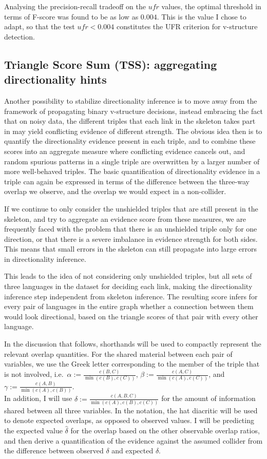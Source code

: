 Analysing the precision-recall tradeoff on the $ufr$ values, the optimal threshold in terms of F-score was found to be as low as $0.004$. This is the value I chose to adapt, so that the test $ufr < 0.004$ constitutes the UFR criterion for v-structure detection. 

\subsection{Triangle Score Sum (TSS): aggregating directionality hints}
Another possibility to stabilize directionality inference is to move away from the framework of propagating binary v-structure decisions, instead embracing the fact that on noisy data, the different triples that each link in the skeleton takes part in may yield conflicting evidence of different strength. The obvious idea then is to quantify the directionality evidence present in each triple, and to combine these scores into an aggregate measure where conflicting evidence cancels out, and random spurious patterns in a single triple are overwritten by a larger number of more well-behaved triples. The basic quantification of directionality evidence in a triple can again be expressed in terms of the difference between the three-way overlap we observe, and the overlap we would expect in a non-collider.

If we continue to only consider the unshielded triples that are still present in the skeleton, and try to aggregate an evidence score from these measures, we are frequently faced with the problem that there is an unshielded triple only for one direction, or that there is a severe imbalance in evidence strength for both sides. This means that small errors in the skeleton can still propagate into large errors in directionality inference.

This leads to the idea of not considering only unshielded triples, but all sets of three languages in the dataset for deciding each link, making the directionality inference step independent from skeleton inference. The resulting score infers for every pair of languages in the entire graph whether a connection between them would look directional, based on the triangle scores of that pair with every other language.

In the discussion that follows, shorthands will be used to compactly represent the relevant overlap quantities. For the shared material between each pair of variables, we use the Greek letter corresponding to the member of the triple that is not involved, i.e.\ $\alpha := \frac{c(B,C)}{\min(c(B),c(C))}$, $\beta := \frac{c(A,C)}{\min(c(A),c(C))}$, and $\gamma := \frac{c(A,B)}{\min(c(A),c(B))}$.\\
In addition, I will use $\delta := \frac{c(A,B,C)}{\min(c(A),c(B),c(C))}$ for the amount of information shared between all three variables. In the notation, the hat diacritic will be used to denote expected overlaps, as opposed to observed values. I will be predicting the expected value $\hat{\delta}$ for the overlap based on the other observable overlap ratios, and then derive a quantification of the evidence against the assumed collider from the difference between observed $\delta$ and expected $\hat{\delta}$.

